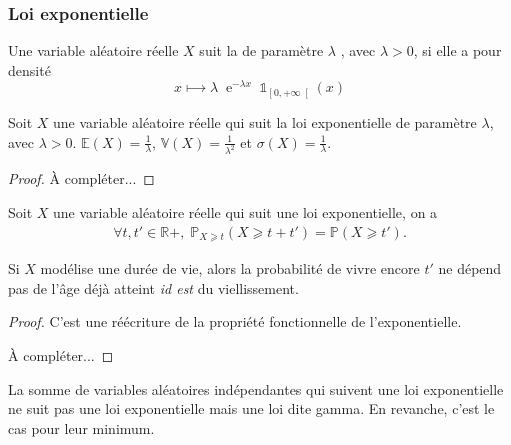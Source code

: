 \subsubsection[Loi exponentielle]{Loi exponentielle}
\begin{definition}
Une variable aléatoire réelle \(𝑋\) suit la  de paramètre
\(𝜆\) , avec \(𝜆>0\), si elle a pour densité
\begin{equation*}
𝑥⟼𝜆\;\operatorname{e}^{-𝜆𝑥}\;𝟙_{\left[0,+∞\right[}(𝑥)
\end{equation*}
\end{definition}
\begin{theorem}
Soit \(𝑋\) une variable aléatoire réelle qui suit la loi exponentielle de paramètre \(𝜆\), avec
\(𝜆>0\).
\(𝔼(X)=\frac 1{𝜆}\), \(𝕍(X)=\frac 1{𝜆^2}\) et \(σ(X)=\frac 1{𝜆}\).
\end{theorem}
\begin{proof}
À compléter...
\end{proof}
\begin{theorem}
[Vieillissement]
Soit \(𝑋\) une variable aléatoire réelle qui suit une loi exponentielle, on a
\begin{gather*}
∀𝑡,𝑡'∈ℝ+,\;ℙ_{𝑋⩾𝑡}(𝑋⩾𝑡+𝑡')=ℙ(𝑋⩾𝑡').
\end{gather*}
\end{theorem}
\begin{remark}
Si \(𝑋\) modélise une durée de vie, alors la probabilité de vivre encore \(𝑡'\) ne dépend pas de l'âge déjà atteint \emph{id est} du viellissement.
\end{remark}
\begin{proof}
C'est une réécriture de la propriété fonctionnelle de l'exponentielle.

À compléter...
\end{proof}
\begin{remark}
La somme de variables aléatoires indépendantes qui suivent une loi exponentielle ne suit
pas une loi exponentielle mais une loi dite gamma. En revanche, c'est le cas pour leur minimum.
\end{remark}
